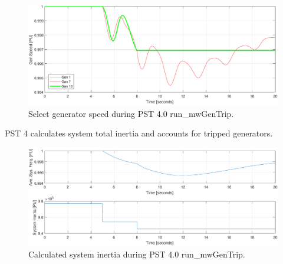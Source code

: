 \begin{figure}[H]
	\centering
	\footnotesize
	\includegraphics[width=\linewidth]{examples/miniWECC/mwGenTrip-4-Speed}
	\caption{Select generator speed during PST 4.0 run\_mwGenTrip.}
	\label{fig: mwGenTrip 4 speed}
\end{figure}%
\pagebreak
PST 4 calculates system total inertia and accounts for tripped generators.
\begin{figure}[H]
	\centering
	\footnotesize
	\includegraphics[width=\linewidth]{examples/miniWECC/mwGenTrip-4-FandH}
	\caption{Calculated system inertia during PST 4.0 run\_mwGenTrip.}
	\label{fig: mwGenTrip 4 FandH}
\end{figure}%